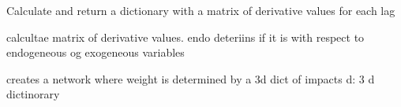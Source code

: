 \documentclass[letterpaper,10pt,english]{sphinxmanual}
\begin{document}

\begin{fulllineitems}
\label{\detokenize{unsorted/modeldiff:modeldiff.calculate_allmat}}
\pysigstartsignatures
{}
\pysigstopsignatures
\sphinxAtStartPar
Calculate and return a dictionary with a matrix of derivative values for each lag

\end{fulllineitems}


\begin{fulllineitems}
\label{\detokenize{unsorted/modeldiff:modeldiff.calculate_matold}}
\pysigstartsignatures
{}
\pysigstopsignatures
\sphinxAtStartPar
calcultae matrix of derivative values.
endo deteriins if it is with respect to endogeneous og exogeneous variables

\end{fulllineitems}


\begin{fulllineitems}
\label{\detokenize{unsorted/modeldiff:modeldiff.modelnet_dict}}
\pysigstartsignatures
{}
\pysigstopsignatures
\sphinxAtStartPar
creates a network where weight is determined by a 3d dict of impacts
d: 3 d dictinorary

\end{fulllineitems}

\end{document}

